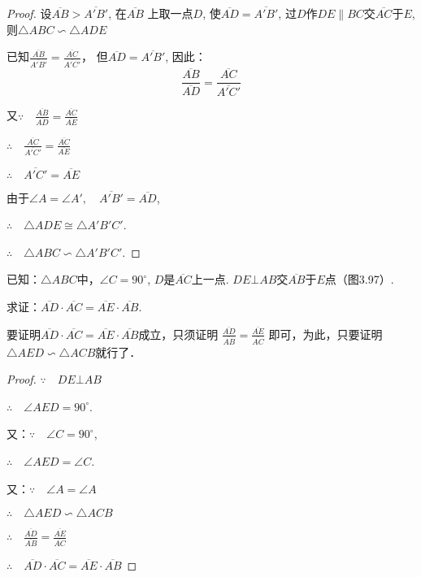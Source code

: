 \begin{proof}
设$\overline{AB}>\overline{A'B'}$, 在$\overline{AB}$
上取一点$D$, 
使$\overline{AD}=\overline{A'B'}$, 过$D$作$DE\parallel BC$交$\overline{AC}$于$E$, 则$\triangle ABC\backsim \triangle ADE$

已知$\frac{\overline{AB}}{\overline{A'B'}}=\frac{\overline{AC}}{\overline{A'C'}}$，
但$\overline{AD}=\overline{A'B'}$, 因此：
\[\frac{\overline{AB}}{\overline{AD}}=\frac{\overline{AC}}{\overline{A'C'}}\]

又$\because\quad \frac{\overline{AB}}{\overline{AD}}=\frac{\overline{AC}}{\overline{AE}}$

$\therefore\quad \frac{\overline{AC}}{\overline{A'C'}}=\frac{\overline{AC}}{\overline{AE}}$

$\therefore\quad \overline{A'C'}=\overline{AE}$

由于$\angle A=\angle A',\quad \overline{A'B'}=\overline{AD}$,

$\therefore\quad \triangle ADE\cong \triangle A'B'C'$.

$\therefore\quad \triangle ABC\backsim \triangle A'B'C'$.
\end{proof}

\begin{example}
    已知：$\triangle ABC$中，$\angle C=90^{\circ}$, $D$是$\overline{AC}$上一点. 
    $DE\bot AB$交$\overline{AB}$于$E$点（图3.97）.

    求证：$\overline{AD}\cdot \overline{AC}=\overline{AE}\cdot \overline{AB}$.
\end{example}

\begin{analyze}
    要证明$\overline{AD}\cdot \overline{AC}=\overline{AE}\cdot \overline{AB}$成立，只须证明
$\frac{\overline{AD}}{\overline{AB}}=\frac{\overline{AE}}{\overline{AC}}$
    即可，为此，只要证明$\triangle AED\backsim \triangle ACB$就行了．
\end{analyze}

\begin{proof}
$\because\quad DE\bot AB$

$\therefore\quad \angle AED=90^{\circ}$.

又：$\because\quad  \angle C=90^{\circ}$,

$\therefore\quad \angle AED=\angle C$.

又：$\because\quad \angle A=\angle A$

$\therefore\quad \triangle AED\backsim \triangle ACB$

$\therefore\quad \frac{\overline{AD}}{\overline{AB}}=\frac{\overline{AE}}{\overline{AC}}$

$\therefore\quad \overline{AD}\cdot \overline{AC}=\overline{AE}\cdot \overline{AB}$ 
\end{proof}

